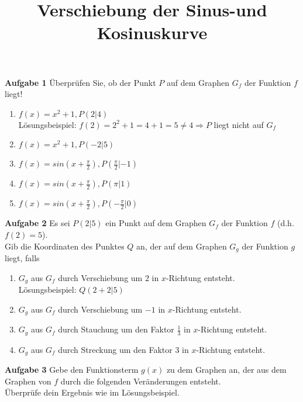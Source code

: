 \documentclass[11pt]{article}
\title{ Verschiebung der Sinus-und Kosinuskurve }
\begin{document}
\maketitle

\textbf{Aufgabe 1} \"Uberpr\"ufen Sie, ob der Punkt $P$ auf dem Graphen $G_f$ der Funktion $f$ liegt!
\begin{enumerate}[label=(\alph*)]
\item $f(x)=x^2+1, P(2|4)$ \\
L\"osungsbeispiel: $f(2) = 2^2+1=4+1=5 \neq 4 \Rightarrow P$ liegt nicht auf $G_f$ 
\item $f(x)=x^2+1, P(-2|5)$ 
\item $f(x)=sin\left( x + \frac{\pi}{2} \right), P\left( \frac{\pi}{2} | -1 \right)$
\item $f(x)=sin\left( x + \frac{\pi}{2} \right), P\left( \pi | 1 \right)$
\item $f(x)=sin\left( x + \frac{\pi}{2} \right), P\left( -\frac{\pi}{2} | 0 \right)$
\end{enumerate}

\textbf{Aufgabe 2} Es sei $P(2|5)$ ein Punkt auf dem Graphen $G_f$ der Funktion $f$ (d.h. $f(2)=5$). \\
Gib die Koordinaten des Punktes $Q$ an, der auf dem Graphen $G_g$ der Funktion $g$ liegt, falls
\begin{enumerate}[label=(\alph*)]
\item $G_g$ aus $G_f$ durch Verschiebung um $2$ in $x$-Richtung entsteht. \\
L\"osungsbeispiel: $Q(2+2|5)$
\item $G_g$ aus $G_f$ durch Verschiebung um $-1$ in $x$-Richtung entsteht.
\item $G_g$ aus $G_f$ durch Stauchung um den Faktor $\frac{1}{3}$ in $x$-Richtung entsteht. 
\item $G_g$ aus $G_f$ durch Streckung um den Faktor $3$ in $x$-Richtung entsteht.
\end{enumerate}

\textbf{Aufgabe 3} Gebe den Funktionsterm $g(x)$ zu dem Graphen an, der aus dem Graphen von $f$ durch die folgenden Ver\"anderungen entsteht. \\
\"Uberpr\"ufe dein Ergebnis wie im L\"osungsbeispiel.
\end{document}
